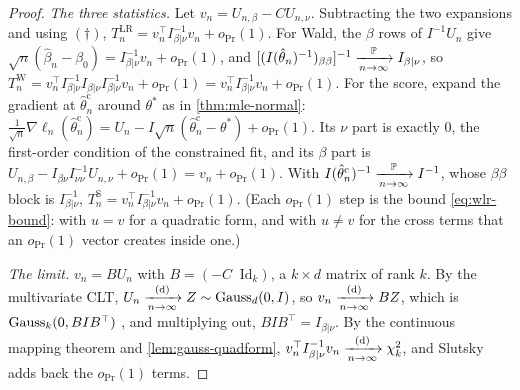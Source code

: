 \begin{proof}
\textit{The three statistics.} Let $v_n = U_{n,\beta} - CU_{n,\nu}$.
Subtracting the two expansions and using $(\dagger)$, $T^{\mathrm{LR}}_n = v_n^\top I_{\beta|\nu}^{-1}v_n + o_\Pr(1)$.
For Wald, the $\beta$ rows of $I^{-1}U_n$ give $\sqrt{n}(\hat{\beta}_n - \beta_0) = I_{\beta|\nu}^{-1}v_n + o_\Pr(1)$, and $[(I(\hat{\theta}_n)^{-1})_{\beta\beta}]^{-1} \xrightarrow [n \to \infty ]{\mathbb{P}} I_{\beta|\nu}$, so $T^{\mathrm{W}}_n = v_n^\top I_{\beta|\nu}^{-1}I_{\beta|\nu}I_{\beta|\nu}^{-1}v_n + o_\Pr(1) = v_n^\top I_{\beta|\nu}^{-1}v_n + o_\Pr(1)$.
For the score, expand the gradient at $\hat{\theta}^{\mathrm{c}}_n$ around $\theta^*$ as in \cref{thm:mle-normal}: $\frac{1}{\sqrt{n}}\nabla\ell_n(\hat{\theta}^{\mathrm{c}}_n) = U_n - I\sqrt{n}(\hat{\theta}^{\mathrm{c}}_n - \theta^*) + o_\Pr(1)$.
Its $\nu$ part is exactly $0$, the first-order condition of the constrained fit, and its $\beta$ part is $U_{n,\beta} - I_{\beta\nu}I_{\nu\nu}^{-1}U_{n,\nu} + o_\Pr(1) = v_n + o_\Pr(1)$.
With $I(\hat{\theta}^{\mathrm{c}}_n)^{-1} \xrightarrow [n \to \infty ]{\mathbb{P}} I^{-1}$, whose $\beta\beta$ block is $I_{\beta|\nu}^{-1}$, $T^{\mathrm{S}}_n = v_n^\top I_{\beta|\nu}^{-1}v_n + o_\Pr(1)$.
(Each $o_\Pr(1)$ step is the bound \eqref{eq:wlr-bound}: with $u = v$ for a quadratic form, and with $u \neq v$ for the cross terms that an $o_\Pr(1)$ vector creates inside one.)

\textit{The limit.} $v_n = BU_n$ with $B = (-C \;\; \mathrm{Id}_k)$, a $k \times d$ matrix of rank $k$.
By the multivariate CLT, $U_n \xrightarrow [n \to \infty ]{\text{(d)}} Z \sim \text{Gauss}_d(0, I)$, so $v_n \xrightarrow [n \to \infty ]{\text{(d)}} BZ$, which is $\text{Gauss}_k(0, BIB^\top)$ , and multiplying out, $BIB^\top = I_{\beta|\nu}$.
By the continuous mapping theorem and \cref{lem:gauss-quadform}, $v_n^\top I_{\beta|\nu}^{-1}v_n \xrightarrow [n \to \infty ]{\text{(d)}} \chi^2_k$, and Slutsky adds back the $o_\Pr(1)$ terms.
\end{proof}

